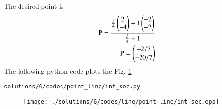 %
The desired point is
\begin{align}
\mathbf{P} = \frac{\frac{3}{4}\begin{pmatrix}2\\-4\end{pmatrix}+1\begin{pmatrix}-2\\-2\end{pmatrix}}{\frac{3}{4}+1} \\
\mathbf{P} = \begin{pmatrix}-2/7\\-20/7\end{pmatrix}
\end{align}
The following python code plots the Fig. \ref{fig:3.6.6_line}
\begin{lstlisting}
solutions/6/codes/point_line/int_sec.py
\end{lstlisting}
\begin{figure}[!ht]
\centering
\texttt{[image: ./solutions/6/codes/line/point\_line/int\_sec.eps]}
\caption{}
\label{fig:3.6.6_line}
\end{figure} 

